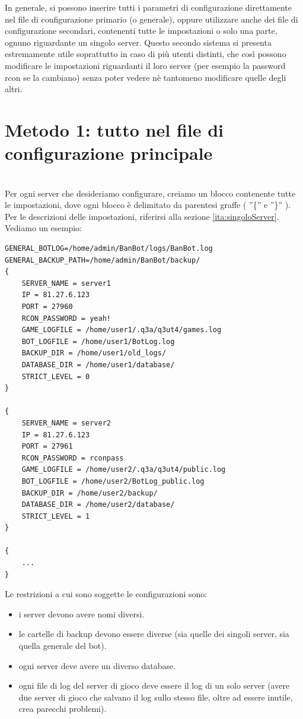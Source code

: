 \documentclass[a4paper]{article}
\begin{document}
In generale, si possono inserire tutti i parametri di configurazione direttamente nel file di configurazione primario (o generale), oppure utilizzare anche dei file di configurazione secondari, contenenti tutte le impostazioni o solo una parte, ognuno riguardante un singolo server.
Questo secondo sistema si presenta estremamente utile soprattutto in caso di pi\`u utenti distinti, che cos\`i possono modificare le impostazioni riguardanti il loro server (per esempio la password rcon se la cambiano) senza poter vedere n\`e tantomeno modificare quelle degli altri.\\

\chapter{\textbf{Metodo 1: tutto nel file di configurazione principale}}\\
Per ogni server che desideriamo configurare, creiamo un blocco contenente tutte le impostazioni, dove ogni blocco \`e delimitato da parentesi graffe ( ''\{'' e ''\}'' ). Per le descrizioni delle impostazioni, riferirsi alla sezione \ref{ita:singoloServer}.
Vediamo un esempio:
\begin{lstlisting}
GENERAL_BOTLOG=/home/admin/BanBot/logs/BanBot.log
GENERAL_BACKUP_PATH=/home/admin/BanBot/backup/
{
	SERVER_NAME = server1
	IP = 81.27.6.123
	PORT = 27960
	RCON_PASSWORD = yeah!
	GAME_LOGFILE = /home/user1/.q3a/q3ut4/games.log
	BOT_LOGFILE = /home/user1/BotLog.log
	BACKUP_DIR = /home/user1/old_logs/
	DATABASE_DIR = /home/user1/database/
	STRICT_LEVEL = 0
}

{
	SERVER_NAME = server2
	IP = 81.27.6.123
	PORT = 27961
	RCON_PASSWORD = rconpass
	GAME_LOGFILE = /home/user2/.q3a/q3ut4/public.log
	BOT_LOGFILE = /home/user2/BotLog_public.log
	BACKUP_DIR = /home/user2/backup/
	DATABASE_DIR = /home/user2/database/
	STRICT_LEVEL = 1
}

{
	...
}
\end{lstlisting}

Le restrizioni a cui sono soggette le configurazioni sono:
\begin{itemize}
\item i server devono avere nomi diversi.
\item le cartelle di backup devono essere diverse (sia quelle dei singoli server, sia quella generale del bot).
\item ogni server deve avere un diverso database.
\item ogni file di log del server di gioco deve essere il log di un solo server (avere due server di gioco che salvano il log sullo stesso file, oltre ad essere inutile, crea parecchi problemi).
\end{itemize}
\end{document}
